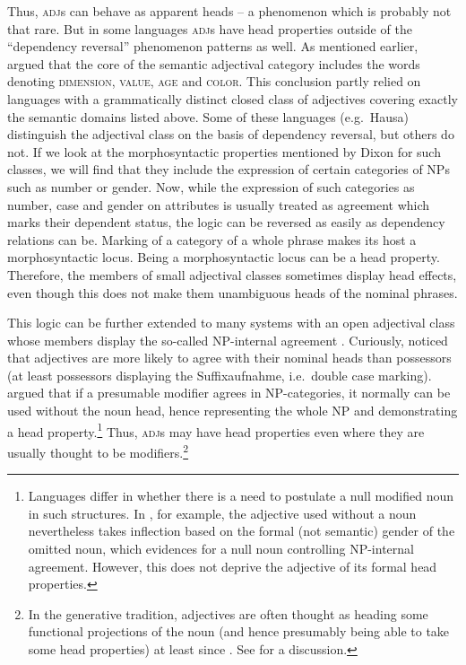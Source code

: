 \documentclass[output=paper
  ,nobabel
  ,draftmode
  ,colorlinks, citecolor=brown
]{langscibook}
\begin{document}
\noindent
Thus, \textsc{adj}s can behave as apparent heads – a phenomenon which is probably not that rare. But in some languages \textsc{adj}s have head properties outside of the ``dependency reversal'' phenomenon patterns as well. As mentioned earlier, \citet{Dixon1979} argued that the core of the semantic adjectival category includes the words denoting \textsc{dimension}, \textsc{value}, \textsc{age} and \textsc{color}. This conclusion partly relied on languages with a grammatically distinct closed class of adjectives covering exactly the semantic domains listed above. Some of these languages (e.g.\ Hausa) distinguish the adjectival class on the basis of dependency reversal, but others do not. If we look at the morphosyntactic properties mentioned by Dixon for such classes, we will find that they include the expression of certain categories of NPs such as number or gender. Now, while the expression of such categories as number, case and gender on attributes is usually treated as agreement which marks their dependent status, the logic can be reversed as easily as dependency relations can be. Marking of a category of a whole phrase makes its host a morphosyntactic locus. Being a morphosyntactic locus can be a head property. Therefore, the members of small adjectival classes sometimes display head effects, even though this does not make them unambiguous heads of the nominal phrases.

\largerpage[-1]
This logic can be further extended to many systems with an open adjectival class whose members display the so-called NP-internal agreement \citep[cf.][21--23 for ]{Corbett93a}. Curiously, \citet{Moravcsik1995} noticed that adjectives are more likely to agree with their nominal heads than possessors (at least possessors displaying the Suffixaufnahme, i.e.\ double case marking). \citet{Lander2010} argued that if a presumable modifier agrees in NP-categories, it normally can be used without the noun head, hence representing the whole NP and demonstrating a head property.\footnote{Languages differ in whether there is a need to postulate a null modified noun in such structures. In , for example, the adjective used without a noun nevertheless takes inflection based on the formal (not semantic) gender of the omitted noun, which evidences for a null noun controlling NP-internal agreement. However, this does not deprive the adjective of its formal head properties.}
Thus, \textsc{adj}s may have head properties even where they are usually thought to be modifiers.\footnote{In the generative tradition, adjectives are often thought as heading some functional projections of the noun (and hence presumably being able to take some head properties) at least since \citet{Abney87a}. See \citet{Cinque2010} for a  discussion.} 
\end{document}
